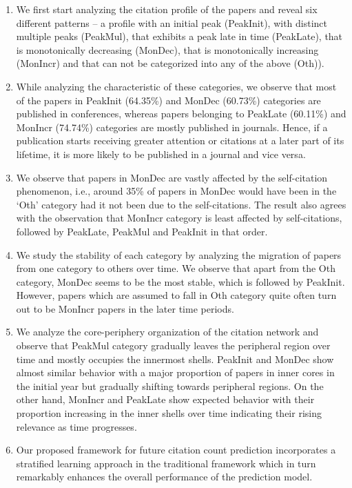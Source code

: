 \begin{enumerate}
 \item We first start analyzing the citation profile of the papers and reveal six different patterns -- a profile with an initial peak
(PeakInit), with distinct multiple peaks (PeakMul), that exhibits a peak late in time (PeakLate), that is monotonically decreasing (MonDec),
that is monotonically increasing (MonIncr) and that can not be categorized into any of the above (Oth)).

\item While analyzing the characteristic of these categories, we observe that most of the papers in PeakInit (64.35\%) and
MonDec (60.73\%) categories are published in conferences, whereas papers belonging to PeakLate (60.11\%) and MonIncr (74.74\%)
categories are
mostly published in journals. Hence, if a publication starts receiving greater attention or citations at a later part of its lifetime, it is
more likely to be published in a journal and vice versa.


\item We observe that papers in MonDec are vastly affected by the self-citation phenomenon, i.e., around 35\% of papers in MonDec would have
been in the `Oth' category had it not been due to the self-citations. The result also agrees with the observation that  MonIncr
category is least affected by self-citations, followed by PeakLate, PeakMul and PeakInit in that order.

\item We study the stability of each category by analyzing the migration of papers from one category to others over time. We
observe that apart from the Oth category, MonDec seems to be the most stable, which is followed by PeakInit. However, papers which 
are assumed to fall in Oth category quite often turn out to be MonIncr papers in the later time periods. 

\item We analyze the core-periphery organization of the citation network and observe that PeakMul category gradually leaves the peripheral
region over time and mostly occupies the innermost shells. PeakInit and MonDec show almost similar behavior with a major proportion of
papers in inner cores in the initial year but gradually shifting towards peripheral regions. On the other hand, MonIncr and PeakLate show
expected behavior with their proportion increasing in the inner shells over time indicating their rising relevance as time progresses.

\item Our proposed framework for future citation count prediction incorporates a stratified learning approach in the traditional framework
which in turn remarkably enhances the overall performance of the prediction model.


\end{enumerate}
